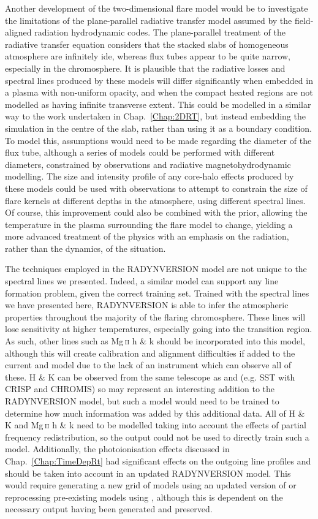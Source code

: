 Another development of the two-dimensional flare model would be to investigate the limitations of the  plane-parallel radiative transfer model assumed by the field-aligned radiation hydrodynamic codes.
The plane-parallel treatment of the radiative transfer equation considers that the stacked slabs of homogeneous atmosphere are infinitely ide, whereas flux tubes appear to be quite narrow, especially in the chromosphere.
It is plausible that the radiative losses and spectral lines produced by these models will differ significantly when embedded in a plasma with non-uniform opacity, and when the compact heated regions are not modelled as having infinite transverse extent.
This could be modelled in a similar way to the work undertaken in Chap.~\ref{Chap:2DRT}, but instead embedding the \Radyn{} simulation in the centre of the slab, rather than using it as a boundary condition.
To model this, assumptions would need to be made regarding the diameter of the flux tube, although a series of models could be performed with different diameters, constrained by observations and radiative magnetohydrodynamic modelling.
The size and intensity profile of any core-halo effects produced by these models could be used with observations to attempt to constrain the size of flare kernels at different depths in the atmosphere, using different spectral lines.
Of course, this improvement could also be combined with the prior, allowing the temperature in the plasma surrounding the flare model to change, yielding a more advanced treatment of the physics with an emphasis on the radiation, rather than the dynamics, of the situation.

The techniques employed in the RADYNVERSION model are not unique to the spectral lines we presented.
Indeed, a similar model can support any line formation problem, given the correct training set.
Trained with the spectral lines we have presented here, RADYNVERSION is able to infer the atmospheric properties throughout the majority of the flaring chromosphere.
These lines will lose sensitivity at higher temperatures, especially going into the transition region.
As such, other lines such as Mg\,\textsc{ii} h \& k should be incorporated into this model, although this will create calibration and alignment difficulties if added to the current \Ha{} and \CaLine{} model due to the lack of an instrument which can observe all of these.
\Caii{} H \& K can be observed from the same telescope as \Ha{} and \CaLine{} (e.g. SST with CRISP and CHROMIS) so may represent an interesting addition to the RADYNVERSION model, but such a model would need to be trained to determine how much information was added by this additional data.
All of \Caii{} H \& K and Mg\,\textsc{ii} h \& k need to be modelled taking into account the effects of partial frequency redistribution, so the \Radyn{} output could not be used to directly train such a model.
Additionally, the \Caii{} photoionisation effects discussed in Chap.~\ref{Chap:TimeDepRt} had significant effects on the outgoing line profiles and should be taken into account in an updated RADYNVERSION model.
This would require generating a new grid of models using an updated version of \Radyn{} or reprocessing pre-existing models using \Lw{}, although this is dependent on the necessary output having been generated and preserved.

